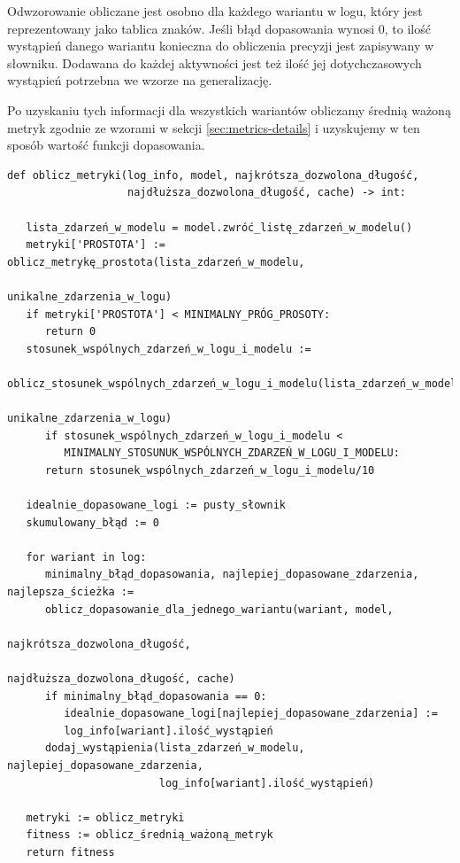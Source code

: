 Odwzorowanie obliczane jest osobno dla każdego wariantu w logu, który jest reprezentowany jako tablica znaków. Jeśli błąd dopasowania wynosi 0, to ilość wystąpień danego wariantu konieczna do obliczenia precyzji jest zapisywany w słowniku. Dodawana do każdej aktywności jest też ilość jej dotychczasowych wystąpień potrzebna we wzorze na generalizację.

Po uzyskaniu tych informacji dla wszystkich wariantów obliczamy średnią ważoną metryk zgodnie ze wzorami w sekcji \ref{sec:metrics-details} i uzyskujemy w ten sposób wartość funkcji dopasowania.

\lstset{caption=Obliczanie metryk, captionpos=b}
\lstset{label=src:best_result, frame=single}
\begin{lstlisting}[escapeinside=``]
def oblicz_metryki(log_info, model, najkrótsza_dozwolona_długość, 
                   najdłuższa_dozwolona_długość, cache) -> int:
                   
   lista_zdarzeń_w_modelu = model.zwróć_listę_zdarzeń_w_modelu()
   metryki['PROSTOTA'] := oblicz_metrykę_prostota(lista_zdarzeń_w_modelu, 
                                                  unikalne_zdarzenia_w_logu)
   if metryki['PROSTOTA'] < MINIMALNY_PRÓG_PROSOTY:
      return 0
   stosunek_wspólnych_zdarzeń_w_logu_i_modelu := 
      oblicz_stosunek_wspólnych_zdarzeń_w_logu_i_modelu(lista_zdarzeń_w_modelu, 
                                                        unikalne_zdarzenia_w_logu)		   
      if stosunek_wspólnych_zdarzeń_w_logu_i_modelu <
         MINIMALNY_STOSUNUK_WSPÓLNYCH_ZDARZEŃ_W_LOGU_I_MODELU:
      return stosunek_wspólnych_zdarzeń_w_logu_i_modelu/10
        
   idealnie_dopasowane_logi := pusty_słownik
   skumulowany_błąd := 0
    
   for wariant in log:
      minimalny_błąd_dopasowania, najlepiej_dopasowane_zdarzenia, najlepsza_ścieżka := 
      oblicz_dopasowanie_dla_jednego_wariantu(wariant, model, 
                                              najkrótsza_dozwolona_długość, 
                                              najdłuższa_dozwolona_długość, cache)
      if minimalny_błąd_dopasowania == 0:
         idealnie_dopasowane_logi[najlepiej_dopasowane_zdarzenia] := 
         log_info[wariant].ilość_wystąpień
      dodaj_wystąpienia(lista_zdarzeń_w_modelu, najlepiej_dopasowane_zdarzenia, 
                        log_info[wariant].ilość_wystąpień)

   metryki := oblicz_metryki 
   fitness := oblicz_średnią_ważoną_metryk
   return fitness
\end{lstlisting}

